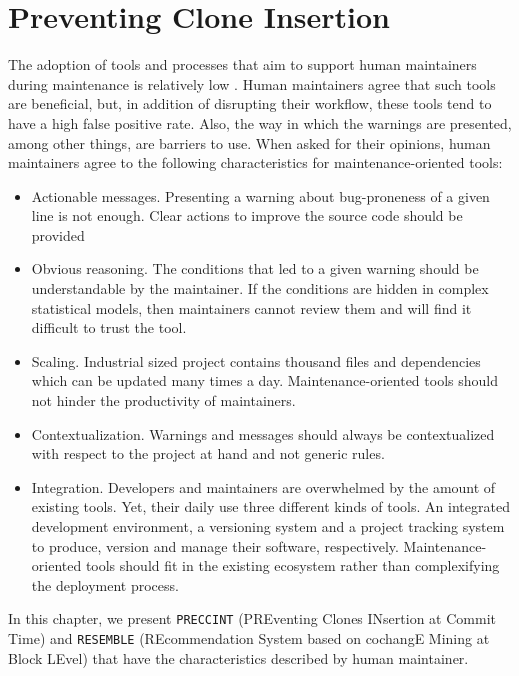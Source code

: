 

\chapter{Preventing Clone Insertion\label{chap:clone-detection-pragmatic}}

The adoption of tools and processes that aim to support human maintainers during maintenance is relatively low \cite{Lewis2013,Foss2015,Layman2007,Ayewah2007,Ayewah2008,Johnson2013,Norman2013, Lopez2011}.
Human maintainers agree that such tools are beneficial, but, in addition of disrupting their workflow, these tools tend to have a high false positive rate.
Also, the way in which the warnings are presented, among other things, are barriers to use\cite{Johnson2013}.
When asked for their opinions, human maintainers agree to the following characteristics for maintenance-oriented tools\cite{Hovemeyer2004, Lopez2011, Lewis2013}:

\begin{itemize}
	\item Actionable messages. Presenting a warning about bug-proneness of a given line is not enough.
	Clear actions to improve the source code should be provided
	\item Obvious reasoning. The conditions that led to a given warning should be understandable by the maintainer.
	If the conditions are hidden in complex statistical models, then maintainers cannot review them and will find it difficult to trust the tool.
	\item Scaling. Industrial sized project contains thousand files and dependencies which can be updated many times a day.
	Maintenance-oriented tools should not hinder the productivity of maintainers.
	\item Contextualization. Warnings and messages should always be contextualized with respect to the project at hand and not generic rules.
	\item Integration. Developers and maintainers are overwhelmed by the amount of existing tools.
	Yet, their daily use three different kinds of tools.
	An integrated development environment, a versioning system and a project tracking system to produce, version and manage their software, respectively.
	Maintenance-oriented tools should fit in the existing ecosystem rather than complexifying the deployment process.
\end{itemize}

In this chapter, we present {\tt PRECCINT} (PREventing Clones INsertion at Commit Time) and {\tt RESEMBLE} (REcommendation System based on cochangE Mining at Block LEvel) that have the characteristics described by human maintainer.

